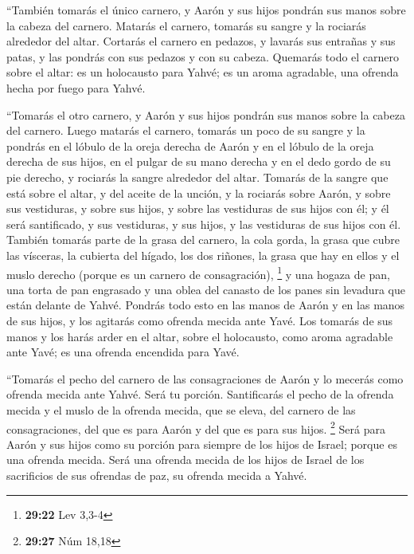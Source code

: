 \begin{paracol}{2}
 ``También tomarás el único carnero, y Aarón y sus hijos
pondrán sus manos sobre la cabeza del carnero.  Matarás
el carnero, tomarás su sangre y la rociarás alrededor del altar.
 Cortarás el carnero en pedazos, y lavarás sus entrañas y
sus patas, y las pondrás con sus pedazos y con su cabeza.
 Quemarás todo el carnero sobre el altar: es un
holocausto para Yahvé; es un aroma agradable, una ofrenda hecha por
fuego para Yahvé.

 ``Tomarás el otro carnero, y Aarón y sus hijos pondrán
sus manos sobre la cabeza del carnero.  Luego matarás el
carnero, tomarás un poco de su sangre y la pondrás en el lóbulo de la
oreja derecha de Aarón y en el lóbulo de la oreja derecha de sus hijos,
en el pulgar de su mano derecha y en el dedo gordo de su pie derecho, y
rociarás la sangre alrededor del altar.  Tomarás de la
sangre que está sobre el altar, y del aceite de la unción, y la rociarás
sobre Aarón, y sobre sus vestiduras, y sobre sus hijos, y sobre las
vestiduras de sus hijos con él; y él será santificado, y sus vestiduras,
y sus hijos, y las vestiduras de sus hijos con él. 
También tomarás parte de la grasa del carnero, la cola gorda, la grasa
que cubre las vísceras, la cubierta del hígado, los dos riñones, la
grasa que hay en ellos y el muslo derecho (porque es un carnero de
consagración), \footnote{\textbf{29:22} Lev 3,3-4}  y una
hogaza de pan, una torta de pan engrasado y una oblea del canasto de los
panes sin levadura que están delante de Yahvé.  Pondrás
todo esto en las manos de Aarón y en las manos de sus hijos, y los
agitarás como ofrenda mecida ante Yavé.  Los tomarás de
sus manos y los harás arder en el altar, sobre el holocausto, como aroma
agradable ante Yavé; es una ofrenda encendida para Yavé.

 ``Tomarás el pecho del carnero de las consagraciones de
Aarón y lo mecerás como ofrenda mecida ante Yahvé. Será tu porción.
 Santificarás el pecho de la ofrenda mecida y el muslo de
la ofrenda mecida, que se eleva, del carnero de las consagraciones, del
que es para Aarón y del que es para sus hijos. \footnote{\textbf{29:27}
  Núm 18,18}  Será para Aarón y sus hijos como su porción
para siempre de los hijos de Israel; porque es una ofrenda mecida. Será
una ofrenda mecida de los hijos de Israel de los sacrificios de sus
ofrendas de paz, su ofrenda mecida a Yahvé.


\end{paracol}
